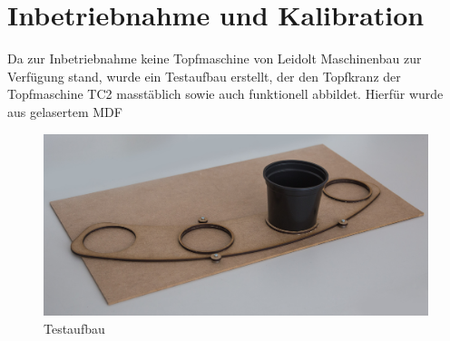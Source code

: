 \newpage
\section{Inbetriebnahme und Kalibration}

Da zur Inbetriebnahme keine Topfmaschine von Leidolt Maschinenbau zur Verfügung stand, wurde ein Testaufbau erstellt, der den Topfkranz der Topfmaschine TC2 masstäblich sowie auch funktionell abbildet. Hierfür wurde aus gelasertem MDF 

\begin{figure}[H]
	\includegraphics[width=1\textwidth]{Illustrationen/7-Inbetriebnahme_und_Kalibration/testaufbau.jpg}
	\caption{Testaufbau}
	\label{fig:testaufbau}
\end{figure}